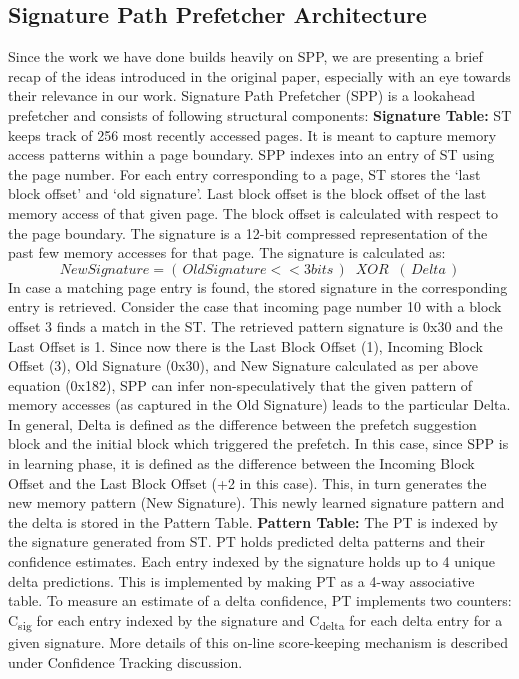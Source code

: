 \documentclass{sig-alternate}
\begin{document}
\subsection{Signature Path Prefetcher Architecture}
Since the work we have done builds heavily on SPP\cite{SPP}, we are presenting a brief recap of the ideas introduced in the original paper, especially with an eye towards their relevance in our work. 
Signature Path Prefetcher (SPP) is a lookahead prefetcher and consists of following structural components:
\newline
\newline
\textbf{Signature Table:} ST keeps track of 256 most recently accessed pages. 
It is meant to capture memory access patterns within a page boundary. 
SPP indexes into an entry of ST using the page number. 
For each entry corresponding to a page, ST stores the `last block offset' and `old signature'. 
Last block offset is the block offset of the last memory access of that given page. 
The block offset is calculated with respect to the page boundary. 
The signature is a 12-bit compressed representation of the past few memory accesses for that page. 
The signature is calculated as:
$$New Signature = (\,Old Signature << 3 bits\,) \;\;XOR\;\; (\,Delta\,)$$ 
In case a matching page entry is found, the stored signature in the corresponding entry is retrieved.
\newline
\newline
Consider the case that incoming page number 10 with a block offset 3 finds a match in the ST. 
The retrieved pattern signature is 0x30 and the Last Offset is 1. 
Since now there is the Last Block Offset (1), Incoming Block Offset (3), Old Signature (0x30), and New Signature calculated as per above equation (0x182), SPP can infer non-speculatively that the given pattern of memory accesses (as captured in the Old Signature) leads to the particular Delta. 
In general, Delta is defined as the difference between the prefetch suggestion block and the initial block which triggered the prefetch. 
In this case, since SPP is in learning phase, it is defined as the difference between the Incoming Block Offset and the Last Block Offset (+2 in this case). 
This, in turn generates the new memory pattern (New Signature). 
This newly learned signature pattern and the delta is stored in the Pattern Table.
\newline
\newline
\textbf{Pattern Table:} The PT is indexed by the signature generated from ST. 
PT holds predicted delta patterns and their confidence estimates. 
Each entry indexed by the signature holds up to 4 unique delta predictions. 
This is implemented by making PT as a 4-way associative table. 
To measure an estimate of a delta confidence, PT implements two counters: C\textsubscript{sig} for each entry indexed by the signature and C\textsubscript{delta} for each delta entry for a given signature. 
More details of this on-line score-keeping mechanism is described under Confidence Tracking discussion.
\end{document}

